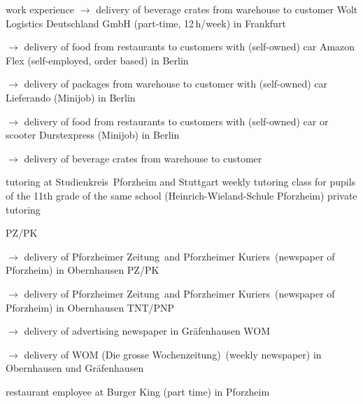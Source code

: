 \begin{rubric}{\textcolor{black!20!blue!100}{work experience}}
			\setlength{\hangindent}{\widthof{$\rightarrow$ }}
			$\rightarrow$ delivery of beverage crates from warehouse to customer
		\entry*[06/03/2024 --- 30/04/2024]
			Wolt Logistics Deutschland GmbH (part-time, 12\,h/week) in Frankfurt
			
			\setlength{\hangindent}{\widthof{$\rightarrow$ }}
			$\rightarrow$ delivery of food from restaurants to customers with (self-owned) car
		\entry*[09/11/2020 --- 06/2022]
			Amazon Flex (self-employed, order based) in Berlin
			
			\setlength{\hangindent}{\widthof{$\rightarrow$ }}
			$\rightarrow$ delivery of packages from warehouse to customer with (self-owned) car
		\entry*[24/10/2020 --- 04/01/2021]
			Lieferando (Minijob) in Berlin
			
			\setlength{\hangindent}{\widthof{$\rightarrow$ }}
			$\rightarrow$ delivery of food from restaurants to customers with (self-owned) car or scooter
		\entry*[17/07/2020 --- 18/10/2020]
			Durstexpress (Minijob) in Berlin
			
			\setlength{\hangindent}{\widthof{$\rightarrow$ }}
			$\rightarrow$ delivery of beverage crates from warehouse to customer
				
		\entry*[10/2015 --- 01/2016]
			tutoring at \glqq Studienkreis\grqq\ Pforzheim and Stuttgart
		\entry*[10/2011 --- 06/2012]
			weekly tutoring class for pupils of the 11th grade of the same school (Heinrich-Wieland-Schule Pforzheim)
		\entry*[\phantom{10/}2010 --- 2016]
			private tutoring
			
		\entry*[08/2015 --- 09/2015]
			PZ/PK
			
			\setlength{\hangindent}{\widthof{$\rightarrow$ }}
			$\rightarrow$ delivery of \glqq Pforzheimer Zeitung\grqq\ and \glqq Pforzheimer Kuriers\grqq\ (newspaper of Pforzheim) in Obernhausen
		\entry*[08/2012 --- 09/2012]
			PZ/PK
			
			\setlength{\hangindent}{\widthof{$\rightarrow$ }}
			$\rightarrow$ delivery of \glqq Pforzheimer Zeitung\grqq\ and \glqq Pforzheimer Kuriers\grqq\ (newspaper of Pforzheim) in Obernhausen
		\entry*[06/2009 --- 10/2010]
			TNT/PNP
			
			\setlength{\hangindent}{\widthof{$\rightarrow$ }}
			$\rightarrow$ delivery of advertising newspaper in Gräfenhausen
		\entry*[06/2007 --- 12/2008]
			WOM
			
			\setlength{\hangindent}{\widthof{$\rightarrow$ }}
			$\rightarrow$ delivery of \glqq WOM (Die grosse Wochenzeitung)\grqq\ (weekly newspaper) in Obernhausen und Gräfenhausen
			
		\entry*[04/2012 --- 10/2012]
			restaurant employee at Burger King (part time) in Pforzheim
\end{rubric}
\versionLanguageEnd